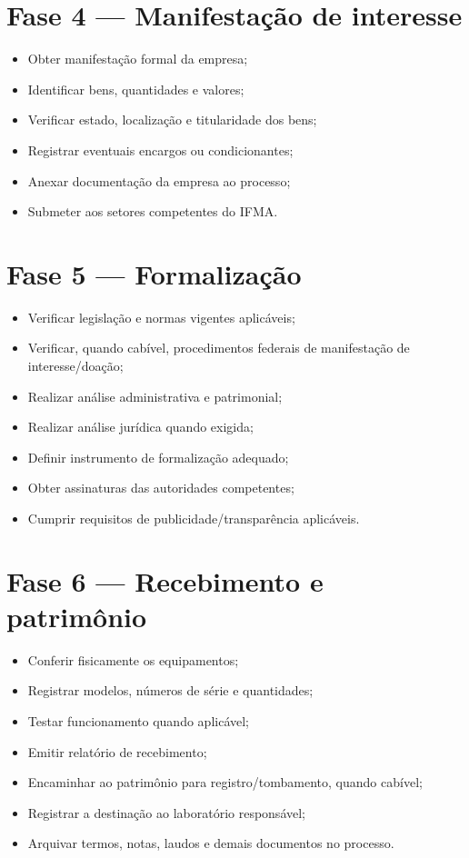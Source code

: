 \documentclass[11pt,a4paper]{article}
\begin{document}
\section{Fase 4 — Manifestação de interesse}
\begin{itemize}[leftmargin=*]
\item[$\square$] Obter manifestação formal da empresa;
\item[$\square$] Identificar bens, quantidades e valores;
\item[$\square$] Verificar estado, localização e titularidade dos bens;
\item[$\square$] Registrar eventuais encargos ou condicionantes;
\item[$\square$] Anexar documentação da empresa ao processo;
\item[$\square$] Submeter aos setores competentes do IFMA.
\end{itemize}

\section{Fase 5 — Formalização}
\begin{itemize}[leftmargin=*]
\item[$\square$] Verificar legislação e normas vigentes aplicáveis;
\item[$\square$] Verificar, quando cabível, procedimentos federais de manifestação de interesse/doação;
\item[$\square$] Realizar análise administrativa e patrimonial;
\item[$\square$] Realizar análise jurídica quando exigida;
\item[$\square$] Definir instrumento de formalização adequado;
\item[$\square$] Obter assinaturas das autoridades competentes;
\item[$\square$] Cumprir requisitos de publicidade/transparência aplicáveis.
\end{itemize}

\section{Fase 6 — Recebimento e patrimônio}
\begin{itemize}[leftmargin=*]
\item[$\square$] Conferir fisicamente os equipamentos;
\item[$\square$] Registrar modelos, números de série e quantidades;
\item[$\square$] Testar funcionamento quando aplicável;
\item[$\square$] Emitir relatório de recebimento;
\item[$\square$] Encaminhar ao patrimônio para registro/tombamento, quando cabível;
\item[$\square$] Registrar a destinação ao laboratório responsável;
\item[$\square$] Arquivar termos, notas, laudos e demais documentos no processo.
\end{itemize}
\end{document}
